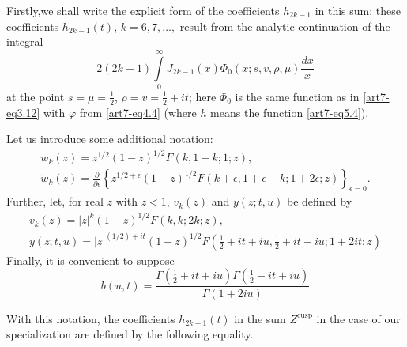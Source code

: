 Firstly,\pageoriginale we shall write the explicit form of the coefficients $h_{2k-1}$ in this sum; these coefficients $h_{2k-1} (t)$, $k = 6,7,\ldots,$ result from the analytic continuation of the integral
\setcounter{section}{9}
\setcounter{equation}{0}
\begin{equation}
2(2k -1) \int\limits^\infty_0 J_{2k -1} (x) \Phi_0 (x; s , v, \rho, \mu) \frac{dx}{x} \label{art7-eq9.1}
\end{equation}
at the point $s = \mu = \frac{1}{2}$, $\rho = v = \frac{1}{2} + it$; here $\Phi_0$ is the same function as in \eqref{art7-eq3.12} with $\varphi$ from \eqref{art7-eq4.4} (where $h$ means the function \eqref{art7-eq5.4}).

Let us introduce some additional notation:
\begin{gather}
w_k(z) = z^{1/2} (1-z)^{1/2} F(k, 1-k; 1;z) ,\label{art7-eq9.2}\\
\tilde{w}_k (z) = \frac{\partial}{\partial \epsilon} \left\{z^{1/2+\epsilon} (1-z)^{1/2} F (k+ \epsilon, 1+ \epsilon -k; 1+ 2 \epsilon ;z)
 \right\}_{\epsilon =0}.
\label{art7-eq9.3}
\end{gather}
Further, let, for real $z$ with $z < 1$, $v_k (z)$ and $y (z; t, u)$ be defined by 
\begin{gather}
v_k(z) = |z|^k (1-z)^{1/2} F(k, k; 2k; z), \label{art7-eq9.4}\\
y (z; t, u) = |z|^{(1/2) + it} (1-z)^{1/2} F(\frac{1}{2} + it + iu, \frac{1}{2} + it - iu; 1+ 2 it; z) \label{art7-eq9.5}
\end{gather}
Finally, it is convenient to suppose
\begin{equation}
b(u,t) = \frac{\Gamma (\frac{1}{2} + it + iu) \Gamma (\frac{1}{2} - it + iu)}{\Gamma (1+ 2 iu)} \label{art7-eq9.6}
\end{equation}

With this notation, the coefficients $h_{2k-1} (t)$ in the sum $Z^{\text{cusp}}$ in the case of our specialization are defined by the following equality. 


